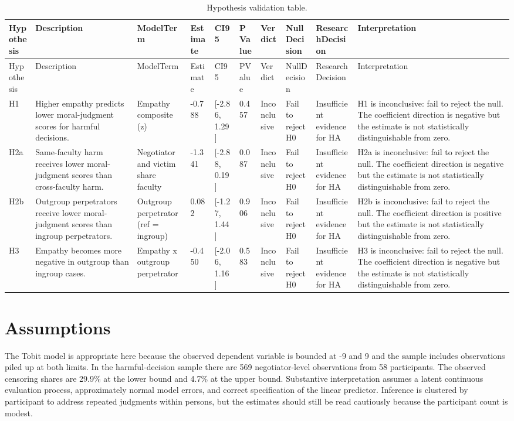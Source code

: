 \documentclass[11pt]{article}
\begin{document}
\begin{longtable}{llllllllll}
\caption{Hypothesis validation table.}\label{tab:hypothesis_validation}\\
\toprule
Hypothesis & Description & ModelTerm & Estimate & CI95 & PValue & Verdict & NullDecision & ResearchDecision & Interpretation \\
\midrule
\endfirsthead
\toprule
Hypothesis & Description & ModelTerm & Estimate & CI95 & PValue & Verdict & NullDecision & ResearchDecision & Interpretation \\
\midrule
\endhead
H1 & Higher empathy predicts lower moral-judgment scores for harmful decisions. & Empathy composite (z) & -0.788 & [-2.86, 1.29] & 0.457 & Inconclusive & Fail to reject H0 & Insufficient evidence for HA & H1 is inconclusive: fail to reject the null. The coefficient direction is negative but the estimate is not statistically distinguishable from zero. \\
H2a & Same-faculty harm receives lower moral-judgment scores than cross-faculty harm. & Negotiator and victim share faculty & -1.341 & [-2.88, 0.19] & 0.087 & Inconclusive & Fail to reject H0 & Insufficient evidence for HA & H2a is inconclusive: fail to reject the null. The coefficient direction is negative but the estimate is not statistically distinguishable from zero. \\
H2b & Outgroup perpetrators receive lower moral-judgment scores than ingroup perpetrators. & Outgroup perpetrator (ref = ingroup) & 0.082 & [-1.27, 1.44] & 0.906 & Inconclusive & Fail to reject H0 & Insufficient evidence for HA & H2b is inconclusive: fail to reject the null. The coefficient direction is positive but the estimate is not statistically distinguishable from zero. \\
H3 & Empathy becomes more negative in outgroup than ingroup cases. & Empathy x outgroup perpetrator & -0.450 & [-2.06, 1.16] & 0.583 & Inconclusive & Fail to reject H0 & Insufficient evidence for HA & H3 is inconclusive: fail to reject the null. The coefficient direction is negative but the estimate is not statistically distinguishable from zero. \\
\bottomrule
\end{longtable}
\section{Assumptions}
The Tobit model is appropriate here because the observed dependent variable is bounded at -9 and 9 and the sample includes observations piled up at both limits. In the harmful-decision sample there are 569 negotiator-level observations from 58 participants. The observed censoring shares are 29.9\% at the lower bound and 4.7\% at the upper bound. Substantive interpretation assumes a latent continuous evaluation process, approximately normal model errors, and correct specification of the linear predictor. Inference is clustered by participant to address repeated judgments within persons, but the estimates should still be read cautiously because the participant count is modest.
\end{document}
